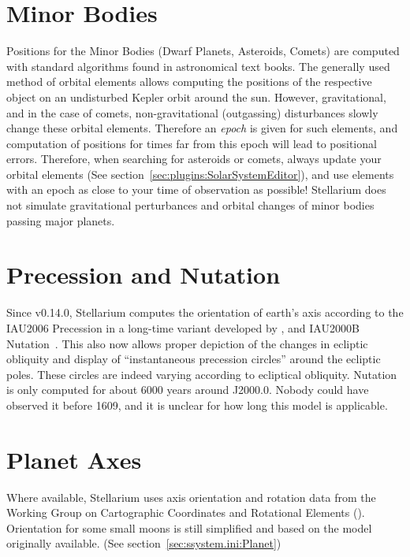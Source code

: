 \section{Minor Bodies}
\label{sec:Accuracy:MinorBodies}

Positions for the Minor Bodies (Dwarf Planets, Asteroids, Comets) are
computed with standard algorithms found in astronomical text
books. The generally used method of orbital elements allows computing
the positions of the respective object on an undisturbed Kepler orbit
around the sun. However, gravitational, and in the case of comets,
non-gravitational (outgassing) disturbances slowly change these
orbital elements. Therefore an \emph{epoch} is given for such
elements, and computation of positions for times far from this epoch
will lead to positional errors. Therefore, when searching for
asteroids or comets, always update your orbital elements (See section~\ref{sec:plugins:SolarSystemEditor}), 
and use elements with an epoch as close to your time of observation as
possible! Stellarium does not simulate gravitational perturbances and
orbital changes of minor bodies passing major planets.

\section{Precession and Nutation}
\label{sec:Accuracy:Precession}

Since v0.14.0, Stellarium computes the orientation of earth's axis
according to the IAU2006 Precession in a long-time variant developed
by \citet{2011AA:Vondrak, 2012AA:Vondrak}, and IAU2000B Nutation~\citep{Nutation:IAU2000B}.
This also now allows proper depiction of the changes in ecliptic obliquity
and display of ``instantaneous precession circles'' around the
ecliptic poles. These circles are indeed varying according to
ecliptical obliquity. Nutation is only computed for about 6000 years
around J2000.0. Nobody could have observed it before 1609, and it is
unclear for how long this model is applicable.

\section{Planet Axes}
\label{sec:Accuracy:PlanetAxes}

Where available, Stellarium uses  axis orientation
and rotation data from the  Working Group on
Cartographic Coordinates and Rotational Elements ().
Orientation for some small moons is still simplified and
based on the model originally available. (See section~\ref{sec:ssystem.ini:Planet})

